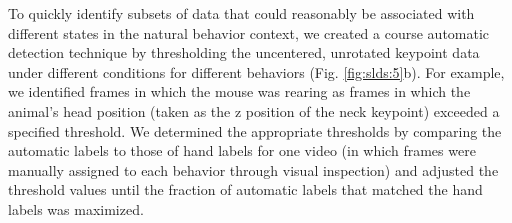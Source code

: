 To quickly identify subsets of data that could reasonably be associated with different states in the natural behavior context, we created a course automatic detection technique by thresholding the uncentered, unrotated keypoint data under different conditions for different behaviors (Fig. \ref{fig:slds:5}b). For example, we identified frames in which the mouse was rearing as frames in which the animal's head position (taken as the z position of the neck keypoint) exceeded a specified threshold. We determined the appropriate thresholds by comparing the automatic labels to those of hand labels for one video (in which frames were manually assigned to each behavior through visual inspection) and adjusted the threshold values until the fraction of automatic labels that matched the hand labels was maximized. 